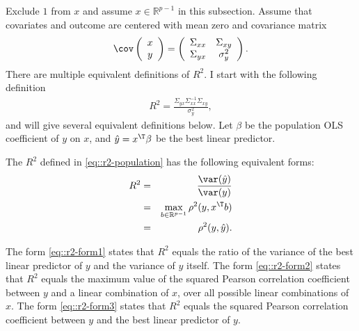 Exclude $1$ from $x $ and assume $ x \in \mathbb{R}^{p-1}$ in this subsection. 
Assume that covariates and outcome are centered with mean zero and covariance matrix
\[
\cov\left(\begin{array}{c}
x\\
y
\end{array}\right)=\left(\begin{array}{cc}
\Sigma_{xx} & \Sigma_{xy}\\
\Sigma_{yx} & \sigma_{y}^{2}
\end{array}\right).
\]
There are multiple equivalent definitions of $R^2$. I start with the following definition
\begin{eqnarray}
R^{2}=\frac{\Sigma_{yx}\Sigma_{xx}^{-1}\Sigma_{xy}}{\sigma_{y}^{2}}, \label{eq::r2-population}
\end{eqnarray}
and will give several equivalent definitions below. 
Let $  \beta $ be the
population OLS coefficient of $y$ on $x$, and $\hat{y}=   x^{\T}\beta$ be the best
linear predictor. 

\begin{theorem}\label{thm::population-r2}
The $R^{2}$ defined in \eqref{eq::r2-population} has the following equivalent forms:
\begin{eqnarray}
R^{2} &=& \frac{\var(\hat{y})}{\var(y)} \label{eq::r2-form1} \\
&=& \max_{b   \in \mathbb{R}^{p-1}  }\rho ^{2}(y,x^{\T}b) \label{eq::r2-form2} \\
&=& \rho ^{2}(y,\hat{y}). \label{eq::r2-form3}
\end{eqnarray}
\end{theorem}

The form \eqref{eq::r2-form1} states that $R^{2}$ equals the ratio of the variance of the best linear predictor of $y$ and the variance of $y$ itself.
The form \eqref{eq::r2-form2} states that $R^{2}$ equals the maximum value of the squared Pearson correlation coefficient between $y$ and a linear combination of $x$, over all possible linear combinations of $x$. 
The form \eqref{eq::r2-form3} states that $R^{2}$ equals the squared Pearson correlation coefficient between $y$ and the best linear predictor of $y$. 

 


